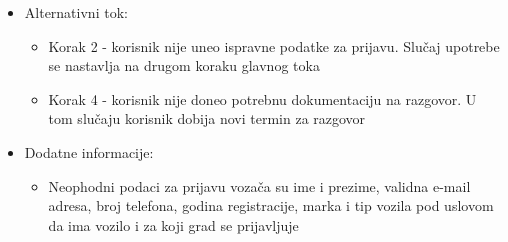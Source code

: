 \begin{itemize}
	\item Alternativni tok:
		\begin{itemize}
    			\item Korak 2 - korisnik nije uneo ispravne podatke za prijavu. Slučaj upotrebe se nastavlja na drugom koraku glavnog toka
		    \item Korak 4 - korisnik nije doneo potrebnu dokumentaciju na razgovor. U tom slučaju korisnik dobija novi termin za razgovor
		\end{itemize}


	\item Dodatne informacije:
		\begin{itemize}
			\item Neophodni podaci za prijavu vozača su ime i prezime, validna e-mail adresa, broj telefona, godina registracije, marka i tip vozila pod uslovom da ima vozilo i za koji grad se prijavljuje
		\end{itemize}						


\end{itemize}


